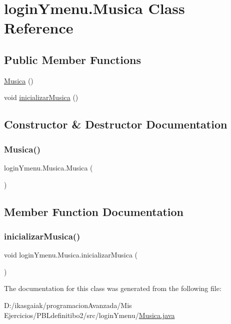 \hypertarget{classlogin_ymenu_1_1_musica}{}\section{login\+Ymenu.\+Musica Class Reference}
\label{classlogin_ymenu_1_1_musica}
\subsection*{Public Member Functions}
\begin{DoxyCompactItemize}
\item 
\mbox{\hyperlink{classlogin_ymenu_1_1_musica_a68618706b36974aa8abd8f7f4860b23b}{Musica}} ()
\item 
void \mbox{\hyperlink{classlogin_ymenu_1_1_musica_a9749d3e78691740c292bcb8a3d6b8cee}{inicializar\+Musica}} ()
\end{DoxyCompactItemize}


\subsection{Constructor \& Destructor Documentation}
\mbox{\label{classlogin_ymenu_1_1_musica_a68618706b36974aa8abd8f7f4860b23b}} 
\subsubsection{\texorpdfstring{Musica()}{Musica()}}
{\footnotesize\ttfamily login\+Ymenu.\+Musica.\+Musica (\begin{DoxyParamCaption}{ }\end{DoxyParamCaption})}



\subsection{Member Function Documentation}
\mbox{\label{classlogin_ymenu_1_1_musica_a9749d3e78691740c292bcb8a3d6b8cee}} 
\subsubsection{\texorpdfstring{inicializar\+Musica()}{inicializarMusica()}}
{\footnotesize\ttfamily void login\+Ymenu.\+Musica.\+inicializar\+Musica (\begin{DoxyParamCaption}{ }\end{DoxyParamCaption})}



The documentation for this class was generated from the following file\+:\begin{DoxyCompactItemize}
\item 
D\+:/ikasgaiak/programacion\+Avanzada/\+Mis Ejercicios/\+P\+B\+Ldefinitibo2/src/login\+Ymenu/\mbox{\hyperlink{_musica_8java}{Musica.\+java}}\end{DoxyCompactItemize}
